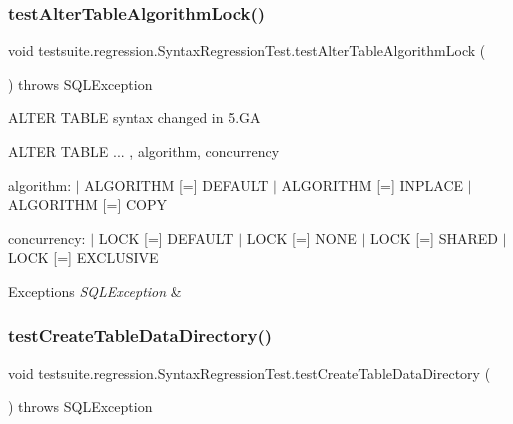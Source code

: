 \subsubsection{\texorpdfstring{test\+Alter\+Table\+Algorithm\+Lock()}{testAlterTableAlgorithmLock()}}
{\footnotesize\ttfamily void testsuite.\+regression.\+Syntax\+Regression\+Test.\+test\+Alter\+Table\+Algorithm\+Lock (\begin{DoxyParamCaption}{ }\end{DoxyParamCaption}) throws S\+Q\+L\+Exception}

A\+L\+T\+ER T\+A\+B\+LE syntax changed in 5.\+GA

A\+L\+T\+ER T\+A\+B\+LE ... , algorithm, concurrency

algorithm\+: $\vert$ A\+L\+G\+O\+R\+I\+T\+HM \mbox{[}=\mbox{]} D\+E\+F\+A\+U\+LT $\vert$ A\+L\+G\+O\+R\+I\+T\+HM \mbox{[}=\mbox{]} I\+N\+P\+L\+A\+CE $\vert$ A\+L\+G\+O\+R\+I\+T\+HM \mbox{[}=\mbox{]} C\+O\+PY

concurrency\+: $\vert$ L\+O\+CK \mbox{[}=\mbox{]} D\+E\+F\+A\+U\+LT $\vert$ L\+O\+CK \mbox{[}=\mbox{]} N\+O\+NE $\vert$ L\+O\+CK \mbox{[}=\mbox{]} S\+H\+A\+R\+ED $\vert$ L\+O\+CK \mbox{[}=\mbox{]} E\+X\+C\+L\+U\+S\+I\+VE


\begin{DoxyExceptions}{Exceptions}
{\em S\+Q\+L\+Exception} & \\
\hline
\end{DoxyExceptions}
\mbox{\label{classtestsuite_1_1regression_1_1_syntax_regression_test_a5e613256d2f2d7d6fbd6144c8b050670}} 
\subsubsection{\texorpdfstring{test\+Create\+Table\+Data\+Directory()}{testCreateTableDataDirectory()}}
{\footnotesize\ttfamily void testsuite.\+regression.\+Syntax\+Regression\+Test.\+test\+Create\+Table\+Data\+Directory (\begin{DoxyParamCaption}{ }\end{DoxyParamCaption}) throws S\+Q\+L\+Exception}

